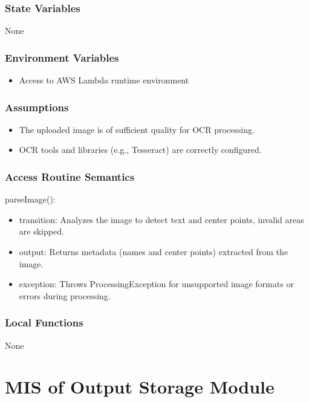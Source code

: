 \documentclass[12pt, titlepage]{article}
\begin{document}
\subsubsection{State Variables}

None

\subsubsection{Environment Variables}

\begin{itemize}
  \item Access to AWS Lambda runtime environment
\end{itemize}

\subsubsection{Assumptions}

\begin{itemize}
  \item The uploaded image is of sufficient quality for OCR processing.
  \item OCR tools and libraries (e.g., Tesseract) are correctly configured.
\end{itemize}

\subsubsection{Access Routine Semantics}

\noindent parseImage():
\begin{itemize}
\item transition: Analyzes the image to detect text and center points, invalid areas are skipped.
\item output: Returns metadata (names and center points) extracted from the image.
\item exception: Throws ProcessingException for unsupported image formats or errors during processing.
\end{itemize}

\subsubsection{Local Functions}

None

\newpage


\section{MIS of Output Storage Module} \label{Module}
\end{document}
